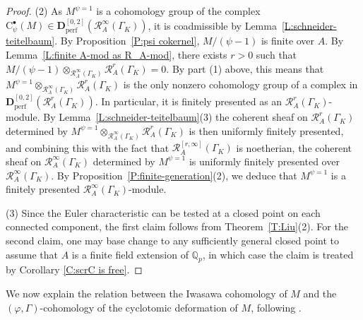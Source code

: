 \documentclass[12pt]{article}
\theoremstyle{definition}
\numberwithin{equation}{theorem}
\newcommand{\calR}{\mathcal{R}}
\newcommand{\QQ}{\mathbb{Q}}
\newcommand{\bbD}{\mathbf{D}}
\newcommand{\rmC}{\mathrm{C}}
\newcommand{\perf}{\mathrm{perf}}
\def\Qp{\QQ_p}
\begin{document}
\begin{proof}
(2) As $M^{\psi=1}$ is a cohomology group of the complex
$\rmC^\bullet_\psi(M) \in
\bbD_\perf^{[0,2]}(\calR_A^\infty(\Gamma_K))$, it is coadmissible by
Lemma~\ref{L:schneider-teitelbaum}.  By Proposition~\ref{P:psi
  cokernel}, $M/(\psi-1)$ is finite over $A$.  By Lemma~\ref{L:finite
  A-mod as R_A-mod}, there exists $r >0$ such that $M/(\psi-1)
\otimes_{\calR_A^\infty(\Gamma_K)} \calR_A^{r}(\Gamma_K) = 0$.  By
part (1) above, this means that $M^{\psi=1}
\otimes_{\calR_A^\infty(\Gamma_K)} \calR_A^{r}(\Gamma_K)$ is the only
nonzero cohomology group of a complex in
$\bbD_\perf^{[0,2]}(\calR_A^{r}(\Gamma_K))$.  In particular, it is
finitely presented as an $\calR_A^{r}(\Gamma_K)$-module.  By
Lemma~\ref{L:schneider-teitelbaum}(3) the coherent sheaf on
$\calR_A^r(\Gamma_K)$ determined by $M^{\psi=1}
\otimes_{\calR_A^\infty(\Gamma_K)} \calR_A^{r}(\Gamma_K)$ is then
uniformly finitely presented, and combining this with the fact that
$\calR_A^{[r,\infty]}(\Gamma_K)$ is noetherian, the coherent sheaf on
$\calR_A^\infty(\Gamma_K)$ determined by $M^{\psi=1}$ is uniformly
finitely presented over $\calR_A^\infty(\Gamma_K)$.  By
Proposition~\ref{P:finite-generation}(2), we deduce that $M^{\psi=1}$
is a finitely presented $\calR_A^\infty(\Gamma_K)$-module.

(3) Since the Euler characteristic can be tested at a closed point on each connected component, the first claim follows from Theorem~\ref{T:Liu}(2).  For the second claim, one may base change to any sufficiently general closed point to assume that $A$ is a finite field extension of $\Qp$, in which case the claim is treated by Corollary \ref{C:scrC is free}.
\end{proof}



We now explain the relation between the Iwasawa cohomology of $M$ and
the $(\varphi, \Gamma)$-cohomology of the cyclotomic deformation of
$M$, following \cite{pottharst2}.
\end{document}

